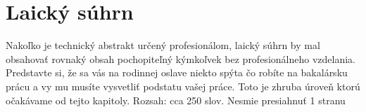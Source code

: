 \section{Laický súhrn}

Nakoľko je technický abstrakt určený profesionálom, laický súhrn by mal obsahovať rovnaký obsah pochopiteľný kýmkoľvek bez profesionálneho vzdelania. Predstavte si, že sa vás na rodinnej oslave niekto spýta čo robíte na bakalársku prácu a vy mu musíte vysvetliť podstatu vašej práce. Toto je zhruba úroveň ktorú očakávame od tejto kapitoly. Rozsah: cca 250 slov. Nesmie presiahnuť 1 stranu

